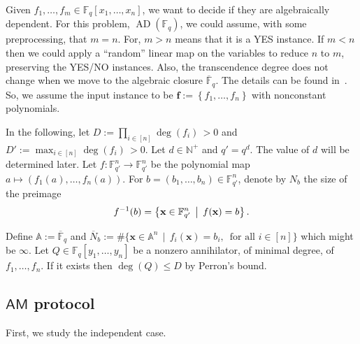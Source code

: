 \documentclass[11pt]{article}
\numberwithin{equation}{section}
\theoremstyle{definition}
\theoremstyle{plain}
\newcommand{\N}{\mathbb N}
\newcommand{\cclass}[1]{\textsf{#1}}
\newcommand{\F}{\mathbb{F}}
\newcommand{\aff}{\mathbb{A}}
\newcommand{\ol}[1]{\overline{#1}}
\newcommand{\inbrace }[1]{\left\{#1\right\}}
\newcommand{\AM}{\cclass{AM}\xspace}  %
\DeclareMathOperator{\AD}{\mathrm{AD}\xspace} %
\begin{document}
Given $f_1,\dots,f_m\in \F_q[x_1,\dots,x_n]$, we want to decide if they are algebraically dependent. For this
%
problem, $\AD(\F_q)$,    %
we could assume, with some preprocessing, that $m=n$. For, $m>n$ means that
%
it is  %
a YES instance. If $m < n$ then we could apply a ``random'' linear map on the variables to reduce 
%
$n$ %
to $m$, preserving the YES/NO instances. Also, the transcendence degree does not change when we move to the algebraic closure $\ol{\F}_q$. The details can be found in~\cite[Lemmas~2.7--2.9]{pandey2016algebraic}. So, we assume the input instance to be $\mathbf f := \inbrace{f_1,\dots,f_n}$ with nonconstant polynomials.
 
 In the following, let $D:=\prod_{i\in [n]}\deg(f_i) \,>0$ and $D':=\max_{i\in [n]} \deg(f_i) \,>0$. Let $d\in\N^+$ and $q'=q^d$. The value of $d$ will be determined later.
 Let $f:\F_{q'}^n\to\F_{q'}^n$ be the polynomial map $a\mapsto (f_1(a),\dots,f_n(a))$. For $b=(b_1,\dots,b_n)\in \F_{q'}^n$, denote by $N_b$ the size of the preimage
 \[
   f^{-1}(b)=\left\{\mathbf x \in \F_{q'}^n \,\bigm|\, f(\mathbf x) = b \right\}.
 \]

Define $\aff:=\ol{\F}_q$ and $\overline{N}_b:= \#\{\mathbf x \in \aff^n \,\mid\, f_i(\mathbf x) = b_i, \, \text{ for all } i\in[n] \}$ which might be $\infty$.
Let $Q\in\F_q[y_1,\dots,y_n]$ be a nonzero annihilator, of minimal degree, of $f_1,\dots,f_n$. If it exists then $\deg(Q)\leq D$ by Perron's bound. 

\subsection{\texorpdfstring{$\AM$}{AM} protocol}

First, we study the independent case.
\end{document}
